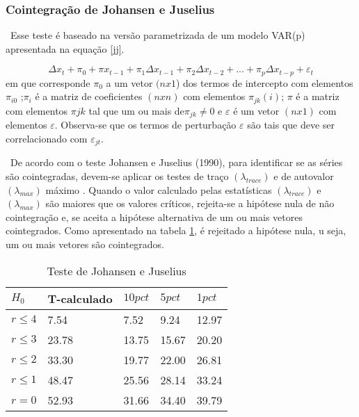 \documentclass[a4paper,12pt,oneside,titlepage]{article}
\begin{document}
\subsubsection{Cointegração de Johansen e Juselius}

\ Esse teste é baseado na versão parametrizada de um modelo VAR(p) apresentada na equação \eqref{jj}.

\begin{equation}
\label{jj}
\Delta x_t + \pi_0 + \pi x_{t-1} + \pi_1 \Delta x_{t-1} + \pi_2 \Delta x_{t-2} + ... + \pi_p \Delta x_{t-p} + \varepsilon_t
\end{equation} 
em que corresponde $\pi_0$ a um vetor $(nx1$) dos termos de intercepto com elementos$\pi_{i0}$ ;$\pi_i$
é a matriz de coeficientes $(nxn)$ com elementos $\pi_{jk}(i)$; $\pi$ é a matriz com elementos $\pi{jk}$
tal que um ou mais de$\pi_{jk}\neq0$ e $\varepsilon$ é um vetor $(nx1)$ com elementos  $\varepsilon$. Observa-se
que os termos de perturbação $\varepsilon$ são tais que deve ser correlacionado com $\varepsilon_{jt}$.


\ De acordo com o teste Johansen e Juselius (1990), para identificar se as
séries são cointegradas, devem-se aplicar os testes de traço $(\lambda_{trace})$ e de autovalor $(\lambda_{max})$
máximo . Quando o valor calculado pelas estatísticas $(\lambda_{trace})$ e $(\lambda_{max})$
são maiores que os valores críticos, rejeita-se a hipótese nula de não
cointegração e, se aceita a hipótese alternativa de um ou mais vetores cointegrados. Como apresentado na tabela \ref{jjtable}, é rejeitado a hipótese nula, u seja, um ou mais vetores são cointegrados. 

\begin{table}[H]
	\caption{Teste de Johansen e Juselius}
	\label{jjtable}
	\begin{center}
		\begin{tabular}{lllll}
			\hline
			$H_0$& T-calculado& $10pct$ & $5pct$ & $1pct$\\ 
			\hline
			$r\leq4$ & 7.54 & 7.52 & 9.24 &12.97 \\ 
			$r\leq3$ & 23.78 &13.75 &15.67 &20.20\\ 
		$r\leq2$ & 33.30 &19.77 &22.00 &26.81\\ 
			$r\leq1$ & 48.47 &25.56 &28.14 &33.24\\ 
			$r=0$ & 52.93 &31.66 &34.40 &39.79 \\ 
		
			\hline
		\end{tabular}
	\end{center}
\end{table}
          
\end{document}

